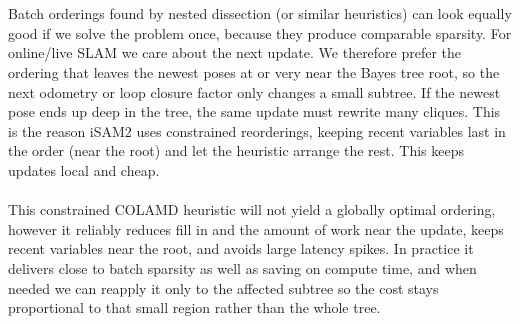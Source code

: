 \\ \\
Batch orderings found by nested dissection (or similar heuristics) can look equally good if we solve the problem once, because they produce comparable sparsity. For online/live SLAM we care about the next update. We therefore prefer the ordering that leaves the newest poses at or very near the Bayes tree root, so the next odometry or loop closure factor only changes a small subtree. If the newest pose ends up deep in the tree, the same update must rewrite many cliques. This is the reason iSAM2 uses constrained reorderings, keeping recent variables last in the order (near the root) and let the heuristic arrange the rest. This keeps updates local and cheap. \cite{Bayes_tree_for_SLAM_paper}
\\ \\
This constrained COLAMD heuristic will not yield a globally optimal ordering, however it reliably reduces fill in and the amount of work near the update, keeps recent variables near the root, and avoids large latency spikes. In practice it delivers close to batch sparsity as well as saving on compute time, and when needed we can reapply it only to the affected subtree so the cost stays proportional to that small region rather than the whole tree.




